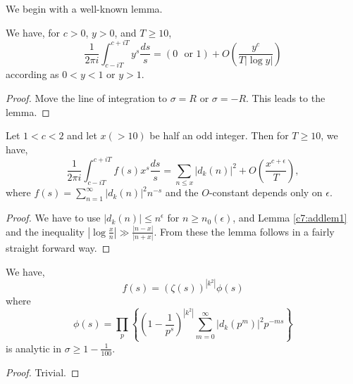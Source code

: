 We begin with a well-known lemma.

\setcounter{lem}{0}
\begin{lem}\label{c7:addlem1}
We have, for $c>0$, $y>0$, and $T\geq 10$,
$$
\frac{1}{2\pi i}\int^{c+iT}_{c-iT}y^{s}\frac{ds}{s}=(0\text{~ or~
}1)+O\left(\frac{y^{c}}{T|\log y|}\right)
$$
according as $0<y<1$ or $y>1$.
\end{lem}

\begin{proof}
Move the line of integration to $\sigma=R$ or $\sigma=-R$. This leads
to the lemma.
\end{proof}

\begin{lem}\label{c7:addlem2}
Let $1<c<2$ and let $x(>10)$ be half an odd integer. Then for $T\geq
10$, we have,
$$
\frac{1}{2\pi i}\int^{c+iT}_{c-iT}f(s)x^{s}\frac{ds}{s}=\sum_{n\leq
  x}|d_{k}(n)|^{2}+O\left(\frac{x^{c+\epsilon}}{T}\right), 
$$
where\pageoriginale
$f(s)=\sum\limits^{\infty}_{n=1}|d_{k}(n)|^{2}n^{-s}$ and the
$O$-constant depends only on $\epsilon$.
\end{lem}

\begin{proof}
We have to use $|d_{k}(n)|\leq n^{\epsilon}$ for $n\geq
n_{0}(\epsilon)$, and Lemma \ref{c7:addlem1} and the inequality
$|\log \frac{x}{n}|\gg \frac{|n-x|}{|n+x|}$. From these the lemma
follows in a fairly straight forward way.
\end{proof}

\begin{lem}\label{c7:lem3}
We have,
$$
f(s)=(\zeta(s))^{|k^{2}|}\phi(s)
$$
where
\begin{equation*}
\phi(s)=\prod_{p}\left\{\left(1-\frac{1}{p^{s}}\right)^{|k^{2}|}\sum^{\infty}_{m=0}|d_{k}(p^{m})|^{2}p^{-ms}\right\}\tag{7.6.1}\label{c7:eq7.6.1}
\end{equation*}
is analytic in $\sigma\geq 1-\frac{1}{100}$.
\end{lem}

\begin{proof}
Trivial.
\end{proof}

